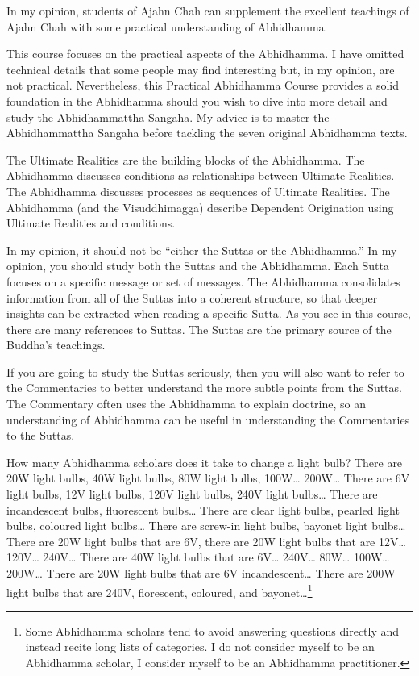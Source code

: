 In my opinion, students of Ajahn Chah can supplement the excellent teachings of Ajahn Chah with some practical understanding of Abhidhamma. 

This course focuses on the practical aspects of the Abhidhamma. I have omitted technical details that some people may find interesting but, in my opinion, are not practical. Nevertheless, this Practical Abhidhamma Course provides a solid foundation in the Abhidhamma should you wish to dive into more detail and study the Abhidhammattha Sangaha. My advice is to master the Abhidhammattha Sangaha before tackling the seven original Abhidhamma texts.


The Ultimate Realities are the building blocks of the Abhidhamma. The Abhidhamma discusses conditions as relationships between Ultimate Realities. The Abhidhamma discusses processes as sequences of Ultimate Realities. The Abhidhamma (and the Visuddhimagga) describe Dependent Origination using Ultimate Realities and conditions.


In my opinion, it should not be “either the Suttas or the Abhidhamma.” In my opinion, you should study both the Suttas and the Abhidhamma. Each Sutta focuses on a specific message or set of messages. The Abhidhamma consolidates information from all of the Suttas into a coherent structure, so that deeper insights can be extracted when reading a specific Sutta. As you see in this course, there are many references to Suttas. The Suttas are the primary source of the Buddha’s teachings.

If you are going to study the Suttas seriously, then you will also want to refer to the Commentaries to better understand the more subtle points from the Suttas. The Commentary often uses the Abhidhamma to explain doctrine, so an understanding of Abhidhamma can be useful in understanding the Commentaries to the Suttas.


How many Abhidhamma scholars does it take to change a light bulb? There are 20W light bulbs, 40W light bulbs, 80W light bulbs, 100W… 200W… There are 6V light bulbs, 12V light bulbs, 120V light bulbs, 240V light bulbs… There are incandescent bulbs, fluorescent bulbs… There are clear light bulbs, pearled light bulbs, coloured light bulbs… There are screw-in light bulbs, bayonet light bulbs… There are 20W light bulbs that are 6V, there are 20W light bulbs that are 12V… 120V… 240V… There are 40W light bulbs that are 6V… 240V… 80W… 100W… 200W… There are 20W light bulbs that are 6V incandescent… There are 200W light bulbs that are 240V, florescent, coloured, and bayonet…\footnote{Some Abhidhamma scholars tend to avoid answering questions directly and instead recite long lists of categories. I do not consider myself to be an Abhidhamma scholar, I consider myself to be an Abhidhamma practitioner.}
